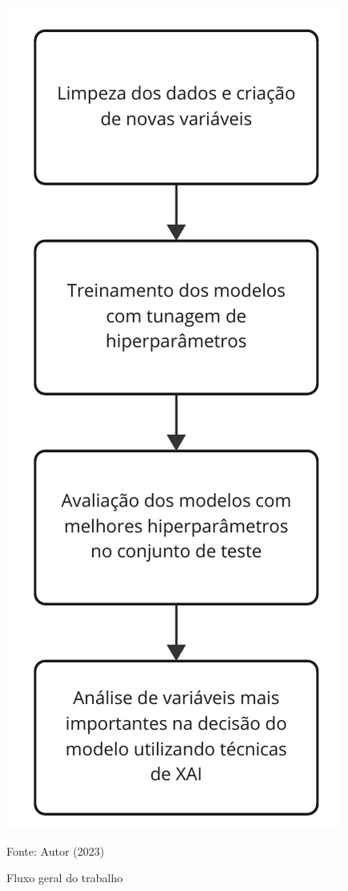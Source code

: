 \begin{figure}[H]
	\centering
	\caption{\label{img:fluxogeral}Fluxo geral do trabalho}
	\includegraphics[scale=0.7]{USPSC-img/fluxo-geral-trabalho.pdf}
	\begin{center}
		Fonte: Autor (2023)
	\end{center}
\end{figure}